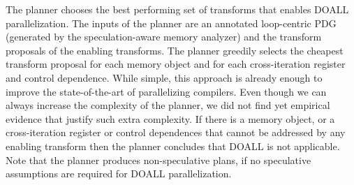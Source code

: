 The planner chooses the best performing set of transforms that enables
DOALL parallelization.
%
The inputs of the planner are an annotated loop-centric PDG (generated
by the speculation-aware memory analyzer) and the transform proposals
of the enabling transforms.
%
%
%
The planner greedily selects the cheapest transform proposal for each
memory object and for each cross-iteration register and control
dependence.
%
%
While simple, this approach is already enough to improve the
state-of-the-art of parallelizing compilers. 
Even though we can always increase the complexity of the planner, we
did not find yet empirical evidence that justify such extra
complexity. 
%
If there is a memory object, or a cross-iteration register or control
dependences that cannot be addressed by any enabling transform then
the planner concludes that DOALL is not applicable.
%
%
%
%
%
Note that the planner produces non-speculative plans, if no
speculative assumptions are required for DOALL parallelization.
